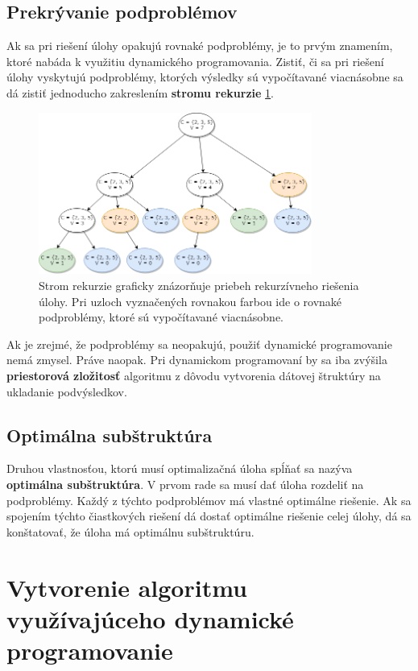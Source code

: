 \subsection{Prekrývanie podproblémov} \label{prekryvPodProb}
Ak sa pri riešení úlohy opakujú rovnaké podproblémy, je to prvým znamením, ktoré nabáda k využitiu dynamického programovania. Zistiť, či sa pri riešení úlohy vyskytujú podproblémy, ktorých výsledky sú vypočítavané viacnásobne sa dá zistiť jednoducho zakreslením \textbf{stromu rekurzie} \ref{stromRekurzie}.

\begin{figure} \label{stromRekurzie}
  \caption{Strom rekurzie graficky znázorňuje priebeh rekurzívneho riešenia úlohy. Pri uzloch vyznačených rovnakou farbou ide o rovnaké podproblémy, ktoré sú vypočítavané viacnásobne.}
  \centering
    \includegraphics[width=0.8\textwidth]{obrazky-figures/coinsTree.png}
\end{figure}

Ak je zrejmé, že podproblémy sa neopakujú, použiť dynamické programovanie nemá zmysel. Práve naopak. Pri dynamickom programovaní by sa iba zvýšila \textbf{priestorová zložitosť}  algoritmu z dôvodu vytvorenia dátovej štruktúry na ukladanie podvýsledkov. 

\subsection{Optimálna subštruktúra} \label{optimalSubstrukt}
Druhou vlastnosťou, ktorú musí optimalizačná úloha spĺňať sa nazýva \textbf{optimálna subštruktúra}. V prvom rade sa musí dať úloha rozdeliť na podproblémy. Každý z týchto podproblémov má vlastné optimálne riešenie. Ak sa spojením týchto čiastkových riešení dá dostať optimálne riešenie celej úlohy, dá sa konštatovať, že úloha má optimálnu subštruktúru. \cite{IntroductionToAlg}

\section{Vytvorenie algoritmu využívajúceho dynamické programovanie}

